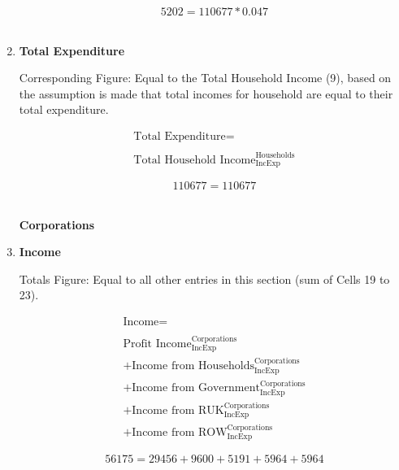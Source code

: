 \begin{enumerate}
\begin{equation} \nonumber
5202 = 110677*0.047
\end{equation}\\


\item \textbf {Total Expenditure}

Corresponding Figure: Equal to the Total Household Income (9), based on the assumption is made that total incomes for household are equal to their total expenditure.

\begin{equation}
\begin{split}
\text{Total Expenditure} =  \\ \\
\text{Total Household Income}^\text{Households}_\text{IncExp}
\end{split} \label{eq:2.5.21}
\end{equation}

\begin{equation} \nonumber
110677 = 110677
\end{equation}\\



\pagebreak

\begin{center}
\textbf{\LARGE Corporations}
\end{center}

\item \textbf {Income}

Totals Figure: Equal to all  other entries in this section (sum of Cells 19 to 23).

\begin{equation}
\begin{split}
\text{Income} =  \\ \\
\text{Profit Income}^\text{Corporations}_\text{IncExp}\\
+\text{Income from Households}^\text{Corporations}_\text{IncExp}\\
+\text{Income from Government}^\text{Corporations}_\text{IncExp}\\
+\text{Income from RUK}^\text{Corporations}_\text{IncExp}\\
+\text{Income from ROW}^\text{Corporations}_\text{IncExp}
\end{split} \label{eq:2.5.22}
\end{equation}

\begin{equation} \nonumber
56175 = 29456+9600+5191+5964+5964
\end{equation}\\


\end{enumerate}
